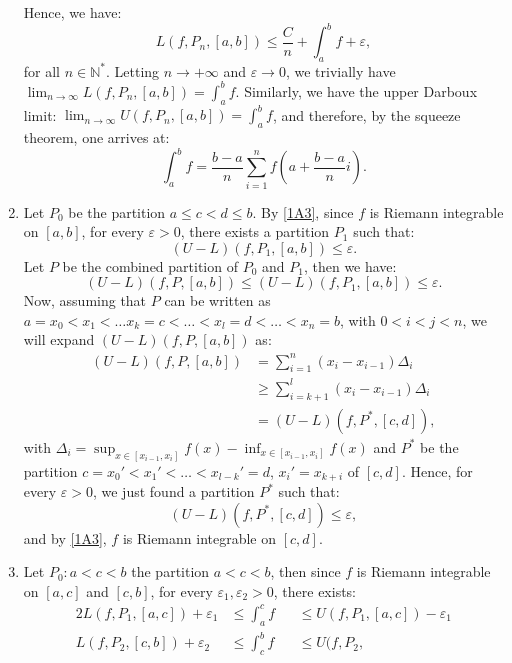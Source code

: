 \begin{enumerate}[label=\textbf{1A.\arabic*}]
  Hence, we have:
  \[
    L(f, P_{n}, [a, b]) \le \frac{C}{n} + \int _{a}^{b} f +\varepsilon
  ,\] for all \( n \in \mathbb{N}^{*} \). Letting \( n \to +\infty \) and \(
  \varepsilon \to 0 \), we trivially have \( \lim_{n \to \infty} L(f, P_{n}, [a,
  b]) = \int _{a}^{b} f \). Similarly, we have the upper Darboux limit: \(
  \lim_{n \to \infty} U(f, P_{n}, [a, b]) = \int _{a}^{b} f \), and therefore,
  by the squeeze theorem, one arrives at:
  \[
    \int _{a}^{b} f = \frac{b-a}{n} \sum_{i = 1}^{n} f \left( a + \frac{b-a}{n}i
  \right)   .\] 
\item \label{1A9} Let \( P_{0} \) be the partition \( a \le c < d \le b \). By \ref{1A3},
  since \( f \) is Riemann integrable on \( [a, b] \), for every \( \varepsilon
  > 0\), there exists a partition
  \( P_{1} \) such that:
  \[
    (U - L)(f, P_{1}, [a, b]) \le \varepsilon
  .\] 
  Let \( P \) be the combined partition of \( P_{0} \) and \( P_{1} \), then we
  have:
  \[
    (U - L)(f, P, [a, b]) \le (U - L)(f, P_{1}, [a, b]) \le \varepsilon
  .\] 
  Now, assuming that \( P \) can be written as \( a = x_{0} < x_{1} < \ldots
  x_{k} = c < \ldots  < x_{l} = d < \ldots  < x_{n} = b \), with \( 0 < i < j <
  n\), we will expand \( (U - L)(f, P, [a, b]) \) as:
  \begin{align*}
    (U - L)(f, P, [a, b]) &= \sum_{i = 1}^{n} (x_{i} - x_{i - 1}) \Delta_{i}  \\
    &\ge \sum_{i = k + 1}^{l} (x_{i} - x_{i - 1}) \Delta_{i} \\
    &= (U - L)(f, P^{*}, [c, d])
  ,\end{align*} with \( \Delta_{i} = \sup_{x \in [x_{i-1},x_{i}]} f(x) -
  \inf_{x\in [x_{i-1},x_{i}]} f(x) \) and \( P^{*} \) be the partition \(
  c = x_{0}' < x_{1}' < \ldots  < x_{l - k}' = d \), \( x_{i}' = x_{k + i} \) of
  \( [c, d] \).
  Hence, for every \( \varepsilon > 0 \), we just found a partition \( P^{*} \)
  such that:
  \[
    (U - L)(f, P^{*}, [c, d]) \le \varepsilon
  ,\] and by \ref{1A3}, \( f \) is Riemann integrable on \( [c, d] \).
\item Let \( P_{0}: a < c < b \) the partition \( a < c < b \), then since \( f
  \) is Riemann integrable on \( [a, c] \) and \( [c, b] \), for every \(
  \varepsilon_{1}, \varepsilon_{2} > 0\), there exists:
  \begin{alignat*}{2}
    L(f, P_{1}, [a, c]) + \varepsilon_{1} &\le \int _{a}^{c} f &&\le U(f, P_{1},
    [a, c]) - \varepsilon_{1}\\
    L(f, P_{2}, [c, b]) + \varepsilon_{2} &\le \int _{c}^{b} f &&\le U(f, P_{2},

\end{alignat*}
\end{enumerate}
